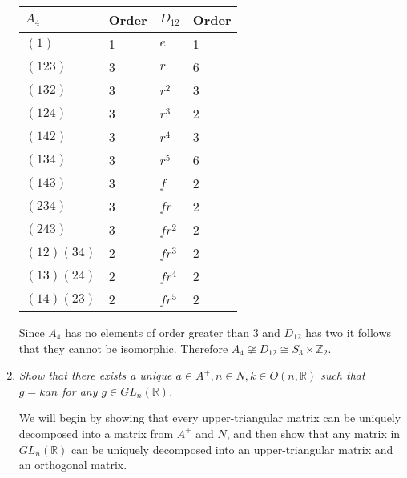 \documentclass[11pt]{article}
\begin{document}
\begin{enumerate}
\begin{center}
\begin{tabular}{|l|l||l|l|}
\hline
$A_4$ & Order & $D_{12}$ & Order\\
\hline
$(1)$ & 1 & $e$ & 1\\
$(123)$ & 3 & $r$ & 6 \\
$(132)$ & 3 & $r^2$ & 3\\
$(124)$ & 3 & $r^3$ & 2\\
$(142)$ & 3 & $r^4$ & 3\\
$(134)$ & 3 & $r^5$ & 6\\
$(143)$ & 3 & $f$ & 2 \\
$(234)$ & 3 & $fr$ & 2 \\
$(243)$ & 3 & $fr^2$ & 2 \\
$(12)(34)$ & 2 & $fr^3$ & 2 \\
$(13)(24)$ & 2 & $fr^4$ & 2 \\
$(14)(23)$ & 2 & $fr^5$ & 2 \\
\hline
\end{tabular}
\end{center}

Since $A_4$ has no elements of order greater than $3$ and $D_{12}$ has two it follows that they cannot be isomorphic.  Therefore $A_4 \not \cong D_{12} \cong S_3 \times \mathbb{Z}_2$.
\item \emph{Show that there exists a unique $a \in A^+, n \in N, k \in O(n, \mathbb{R})$ such that $g = kan$ for any $g \in GL_n(\mathbb{R})$.}

We will begin by showing that every upper-triangular matrix can be uniquely decomposed into a matrix from $A^+$ and $N$, and then show that any matrix in $GL_n(\mathbb{R})$ can be uniquely decomposed into an upper-triangular matrix and an orthogonal matrix.


\end{enumerate}
\end{document}
